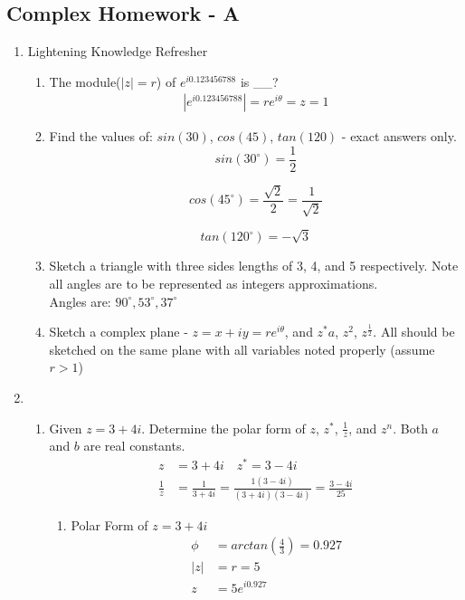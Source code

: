 \documentclass[12pt]{article}
\begin{document}
\subsection{Complex Homework - A}
\begin{enumerate}

	\item Lightening Knowledge Refresher
		\begin{enumerate}

		\item The module($|z| = r$) of $e^{i0.123456788}$ is \_\_?
			\begin{align*}
				    |e^{i0.123456788}| = re^{i \theta} = z = 1
			\end{align*}
		\item Find the values of: $sin(30)$, $cos(45)$, $tan(120)$ - exact answers only.
		\begin{equation*}
			sin(30^{\circ}) = \frac{1}{2} 
		\end{equation*}	

		\begin{equation*}
			cos(45^{\circ}) = \frac{\sqrt{2}}{2} = \frac{1}{\sqrt{2}}	
		\end{equation*}	

		\begin{equation*}
			tan(120^{\circ}) = -\sqrt{3}
		\end{equation*}	


		\item Sketch a triangle with three sides lengths of 3, 4, and 5 respectively. Note all angles are to be represented as integers approximations. \\
			Angles are: $90^{\circ}, 53^{\circ}, 37^{\circ}$
		\item Sketch a complex plane - $z=x+iy=re^{i\theta}$, and $z^{*}a$, $z^{2}$, $z^{\frac{1}{2}}$. All should be sketched on the same plane with all variables noted properly (assume $r > 1$)
		\end{enumerate}


	\item 
		\begin{enumerate}

		    	\item Given $z=3+4i$. Determine the polar form of $z$, $z^{*}$, $\frac{1}{z}$, and $z^{n}$.  Both $a$ and $b$ are real constants.
				\begin{align*}
					z &= 3+4i \quad z^{*}=3-4i\\
					\frac{1}{z}&=\frac{1}{3+4i}=\frac{1(3-4i)}{(3+4i)(3-4i)}=\frac{3-4i}{25}
				\end{align*}
				\begin{enumerate}
				    \item Polar Form of $z=3+4i$
					    \begin{align*}
						    \phi &= arctan(\frac{4}{3}) = 0.927\\
						    |z|&=r=5\\
						    z&=5e^{i0.927}
					    \end{align*}


\end{enumerate}
\end{enumerate}
\end{enumerate}
\end{document}
